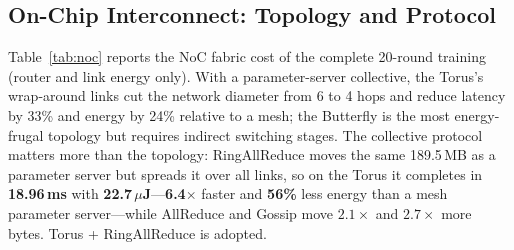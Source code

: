 \documentclass[conference]{IEEEtran}
\begin{document}
\subsection{On-Chip Interconnect: Topology and Protocol}

Table~\ref{tab:noc} reports the NoC fabric cost of the complete 20-round training (router and link energy only). With a parameter-server collective, the Torus's wrap-around links cut the network diameter from 6 to 4 hops and reduce latency by 33\% and energy by 24\% relative to a mesh; the Butterfly is the most energy-frugal topology but requires indirect switching stages. The collective protocol matters more than the topology: RingAllReduce moves the same 189.5\,MB as a parameter server but spreads it over all links, so on the Torus it completes in \textbf{18.96\,ms} with \textbf{22.7\,$\mu$J}---\textbf{6.4$\times$} faster and \textbf{56\%} less energy than a mesh parameter server---while AllReduce and Gossip move $2.1\times$ and $2.7\times$ more bytes. Torus + RingAllReduce is adopted.

\begin{table}[t]
\centering
\caption{NoC Cost of Full FL Training (16 Tiles, 20 Rounds, INT8)}
\label{tab:noc}
\renewcommand{\arraystretch}{1.1}
\setlength{\tabcolsep}{3pt}
\footnotesize
{}
\end{table}
\end{document}
